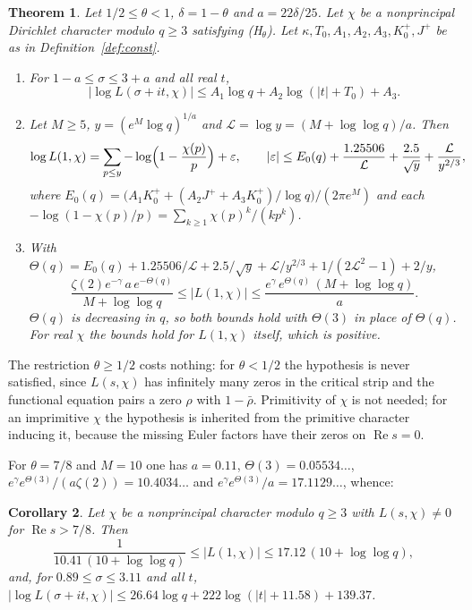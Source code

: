 \documentclass[11pt]{article}
\newtheorem{theorem}{Theorem}[section]
\newtheorem{corollary}[theorem]{Corollary}
\theoremstyle{definition}
\theoremstyle{remark}
\numberwithin{equation}{section}
\newcommand{\Rea}{\operatorname{Re}}
\newcommand{\eps}{\varepsilon}
\begin{document}
\begin{theorem}\label{thm:main}
Let $1/2\le\theta<1$, $\delta=1-\theta$ and $a=22\delta/25$. Let $\chi$ be a nonprincipal Dirichlet character modulo $q\ge3$ satisfying \textup{(H$_\theta$)}. Let $\kappa,T_0,A_1,A_2,A_3,K_0^+,J^+$ be as in Definition~\ref{def:const}.
\begin{enumerate}
\item[\textup{(i)}] For $1-a\le\sigma\le3+a$ and all real $t$,
\[
 |\log L(\sigma+it,\chi)|\le A_1\log q+A_2\log(|t|+T_0)+A_3 .
\]
\item[\textup{(ii)}] Let $M\ge5$, $y=(e^{M}\log q)^{1/a}$ and $\mathcal L=\log y=(M+\log\log q)/a$. Then
\[
 \log L(1,\chi)=\sum_{p\le y}-\log\Bigl(1-\frac{\chi(p)}{p}\Bigr)+\eps,\qquad
 |\eps|\le E_0(q)+\frac{1.25506}{\mathcal L}+\frac{2.5}{\sqrt y}+\frac{\mathcal L}{y^{2/3}},
\]
where $E_0(q)=\bigl(A_1K_0^++(A_2J^++A_3K_0^+)/\log q\bigr)/(2\pi e^{M})$ and each $-\log(1-\chi(p)/p)=\sum_{k\ge1}\chi(p)^k/(kp^k)$.
\item[\textup{(iii)}] With $\Theta(q)=E_0(q)+1.25506/\mathcal L+2.5/\sqrt y+\mathcal L/y^{2/3}+1/(2\mathcal L^2-1)+2/y$,
\[
 \frac{\zeta(2)e^{-\gamma}\,a\,e^{-\Theta(q)}}{M+\log\log q}\le|L(1,\chi)|\le\frac{e^{\gamma}\,e^{\Theta(q)}\,(M+\log\log q)}{a}.
\]
$\Theta(q)$ is decreasing in $q$, so both bounds hold with $\Theta(3)$ in place of $\Theta(q)$. For real $\chi$ the bounds hold for $L(1,\chi)$ itself, which is positive.
\end{enumerate}
\end{theorem}

The restriction $\theta\ge1/2$ costs nothing: for $\theta<1/2$ the hypothesis is never satisfied, since $L(s,\chi)$ has infinitely many zeros in the critical strip and the functional equation pairs a zero $\rho$ with $1-\bar\rho$. Primitivity of $\chi$ is not needed; for an imprimitive $\chi$ the hypothesis is inherited from the primitive character inducing it, because the missing Euler factors have their zeros on $\Rea s=0$.

For $\theta=7/8$ and $M=10$ one has $a=0.11$, $\Theta(3)=0.05534\ldots$, $e^{\gamma}e^{\Theta(3)}/(a\zeta(2))=10.4034\ldots$ and $e^{\gamma}e^{\Theta(3)}/a=17.1129\ldots$, whence:

\begin{corollary}\label{cor:78}
Let $\chi$ be a nonprincipal character modulo $q\ge3$ with $L(s,\chi)\ne0$ for $\Rea s>7/8$. Then
\[
 \frac{1}{10.41\,(10+\log\log q)}\le|L(1,\chi)|\le17.12\,(10+\log\log q),
\]
and, for $0.89\le\sigma\le3.11$ and all $t$, $|\log L(\sigma+it,\chi)|\le26.64\log q+222\log(|t|+11.58)+139.37$.
\end{corollary}
\end{document}
